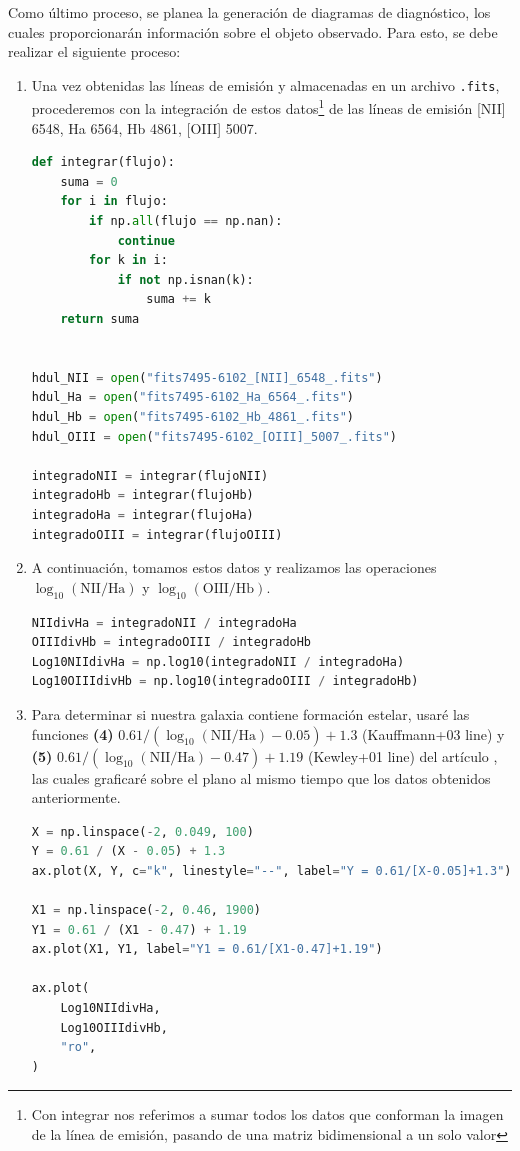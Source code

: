 \documentclass[10pt,twocolumn,a4paper]{opticajnl}
\begin{document}
Como último proceso, se planea la generación de diagramas de diagnóstico, los cuales proporcionarán información sobre el objeto observado. Para esto, se debe realizar el siguiente proceso:
\begin{enumerate}
  \item Una vez obtenidas las líneas de emisión y almacenadas en un archivo \texttt{.fits}, procederemos con la integración de estos datos\footnote{Con integrar nos referimos a sumar todos los datos que conforman la imagen de la línea de emisión, pasando de una matriz bidimensional a un solo valor} de las líneas de emisión [NII] 6548, Ha 6564, Hb 4861, [OIII] 5007.
    \begin{lstlisting}[language=Python]
def integrar(flujo):
    suma = 0
    for i in flujo:
        if np.all(flujo == np.nan):
            continue
        for k in i:
            if not np.isnan(k):
                suma += k
    return suma


hdul_NII = open("fits7495-6102_[NII]_6548_.fits")
hdul_Ha = open("fits7495-6102_Ha_6564_.fits")
hdul_Hb = open("fits7495-6102_Hb_4861_.fits")
hdul_OIII = open("fits7495-6102_[OIII]_5007_.fits")

integradoNII = integrar(flujoNII)
integradoHb = integrar(flujoHb)
integradoHa = integrar(flujoHa)
integradoOIII = integrar(flujoOIII)
    \end{lstlisting}
    
  \item A continuación, tomamos estos datos y realizamos las operaciones \(\log_{10}(\text{NII}/\text{Ha})\) y \(\log_{10}(\text{OIII}/\text{Hb})\).
    \begin{lstlisting}[language=Python]
NIIdivHa = integradoNII / integradoHa
OIIIdivHb = integradoOIII / integradoHb
Log10NIIdivHa = np.log10(integradoNII / integradoHa)
Log10OIIIdivHb = np.log10(integradoOIII / integradoHb)
    \end{lstlisting}
  \item Para determinar si nuestra galaxia contiene formación estelar, usaré las funciones \textbf{(4)} \(0.61 / (\log_{10}(\text{NII}/\text{Ha}) - 0.05) + 1.3\) (Kauffmann+03 line) y \textbf{(5)} \(0.61 / (\log_{10}(\text{NII}/\text{Ha}) - 0.47) + 1.19\) (Kewley+01 line) del artículo \cite{2006MNRAS.372..961K}, las cuales graficaré sobre el plano al mismo tiempo que los datos obtenidos anteriormente.
    \begin{lstlisting}[language=Python]
X = np.linspace(-2, 0.049, 100)
Y = 0.61 / (X - 0.05) + 1.3
ax.plot(X, Y, c="k", linestyle="--", label="Y = 0.61/[X-0.05]+1.3")

X1 = np.linspace(-2, 0.46, 1900)
Y1 = 0.61 / (X1 - 0.47) + 1.19
ax.plot(X1, Y1, label="Y1 = 0.61/[X1-0.47]+1.19")

ax.plot(
    Log10NIIdivHa,
    Log10OIIIdivHb,
    "ro",
)
    \end{lstlisting}
\end{enumerate}                                                                  
\end{document}
